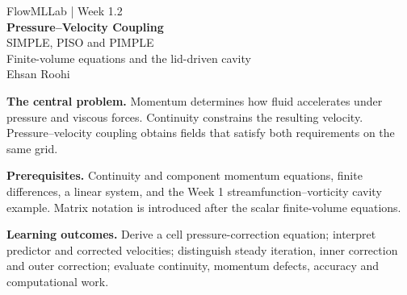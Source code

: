 \documentclass[11pt]{article}
\begin{document}
\begin{center}
\vspace*{12mm}
{\Large FlowMLLab | Week 1.2}\\[12mm]
{\LARGE\bfseries Pressure--Velocity Coupling}\\[5mm]
{\Large SIMPLE, PISO and PIMPLE}\\[4mm]
{\large Finite-volume equations and the lid-driven cavity}\\[8mm]
Ehsan Roohi
\end{center}
\vspace{8mm}
\textbf{The central problem.} Momentum determines how fluid accelerates under pressure and viscous forces. Continuity constrains the resulting velocity. Pressure--velocity coupling obtains fields that satisfy both requirements on the same grid.

\textbf{Prerequisites.} Continuity and component momentum equations, finite differences, a linear system, and the Week 1 streamfunction--vorticity cavity example. Matrix notation is introduced after the scalar finite-volume equations.

\textbf{Learning outcomes.} Derive a cell pressure-correction equation; interpret predictor and corrected velocities; distinguish steady iteration, inner correction and outer correction; evaluate continuity, momentum defects, accuracy and computational work.
\end{document}
